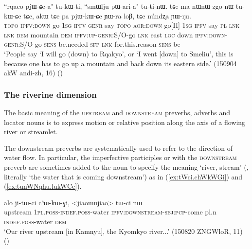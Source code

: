  \begin{exe}
\ex \label{ex:rqaco.pjWCea}
\gll ``rqaco pjɯ-ɕe-a" tu-kɯ-ti, ``smɯlju pɯ-ari-a" tu-ti-nɯ. tɕe ma nɯnɯ zgo nɯ tu-kɯ-ɕe tɕe, akɯ tɕe pa pjɯ-kɯ-ɕe ɲɯ-ra loβ, tɕe núndʐa ɲɯ-ŋu. \\
\textsc{topo} \textsc{ipfv}:\textsc{down}-go-\textsc{1sg} \textsc{ipfv}-\textsc{genr}-say  \textsc{topo} \textsc{aor}:\textsc{down}-go[II]-\textsc{1sg} \textsc{ipfv}-say-\textsc{pl} \textsc{lnk} \textsc{lnk} \textsc{dem} mountain \textsc{dem} \textsc{ipfv}:\textsc{up}-\textsc{genr}:S/O-go \textsc{lnk} east \textsc{loc} down \textsc{ipfv}:\textsc{down}-\textsc{genr}:S/O-go \textsc{sens}-be.needed \textsc{sfp} \textsc{lnk} for.this.reason \textsc{sens}-be \\
\glt `People say `I will go (down) to Rqakyo', or `I went [down] to Smeliu', this is because one has to go up a mountain and back down its eastern side.' (150904 akW andi-zh, 16) ()
\end{exe}

\subsubsection{The riverine dimension} \label{sec:riverine.dimension}
The basic meaning of the \textsc{upstream} and \textsc{downstream} preverbs, adverbs and locator nouns is to express motion or relative position along the axis of a flowing river or streamlet.

The downstream preverbs are systematically used to refer to the direction of water flow. In particular, the imperfective participles  or  with the \textsc{downstream} preverb are sometimes added to the noun  to specify the meaning `river, stream' (, literally `the water that is coming downstream') as in (\ref{ex:tWci.chWkWGi}) and (\ref{ex:tunWNqhu.lukWCe}).

 \begin{exe}
\ex \label{ex:tWci.chWkWGi}
\gll  alo ji-tɯ-ci cʰɯ-kɯ-ɣi, <jiaomujiao> tɯ-ci nɯ    \\
 upstream \textsc{1pl}.\textsc{poss}-\textsc{indef}.\textsc{poss}-water \textsc{ipfv}:\textsc{downstream}-\textsc{sbj}:\textsc{pcp}-come pl.n \textsc{indef}.\textsc{poss}-water \textsc{dem} \\
\glt `Our river upstream [in Kamnyu], the Kyomkyo river...' (150820 ZNGWloR, 11)
()
\end{exe}

